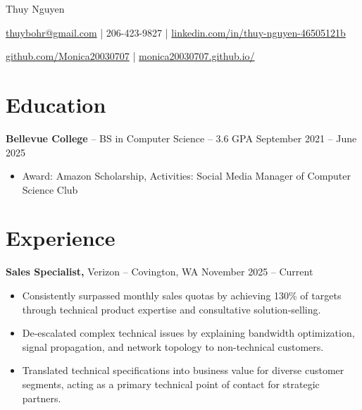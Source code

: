 \documentclass[11pt]{article}       %
\begin{document}
\centerline{\Huge Thuy Nguyen}

\vspace{5pt}

\centerline{\href{mailto:thuybohr@gmail.com}{thuybohr@gmail.com} | 206-423-9827 |
\href{https://www.linkedin.com/in/thuy-nguyen-46505121b/}{linkedin.com/in/thuy-nguyen-46505121b}}

\centerline{\href{https://github.com/Monica20030707}{github.com/Monica20030707} | 
\href{https://monica20030707.github.io/}{monica20030707.github.io/}} 

\vspace{-9pt}

\section*{Education}
\textbf{Bellevue College} -- BS in Computer Science -- 3.6 GPA \hfill September 2021 -- June 2025\\
\vspace{-9pt}
\begin{itemize}
  \item Award: Amazon Scholarship, Activities: Social Media Manager of Computer Science Club
\end{itemize}

\vspace{-18.5pt}

\section*{Experience}

\textbf{Sales Specialist,} {Verizon} -- Covington, WA \hfill November 2025 -- Current \\
\vspace{-9pt}
\begin{itemize}
  \item Consistently surpassed monthly sales quotas by achieving 130\% of targets through technical product expertise and consultative solution-selling.
  \item De-escalated complex technical issues by explaining bandwidth optimization, signal propagation, and network topology to non-technical customers.
  \item Translated technical specifications into business value for diverse customer segments, acting as a primary technical point of contact for strategic partners.
\end{itemize}
\end{document}
